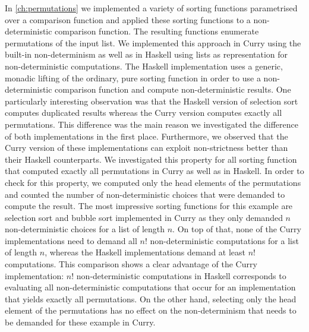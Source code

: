 In \autoref{ch:permutations} we implemented a variety of sorting functions parametrised over a comparison function and applied these sorting functions to a non\--deterministic comparison function.
The resulting functions enumerate permutations of the input list.
We implemented this approach in Curry using the built\--in non\--determinism as well as in Haskell using lists as representation for non\--deterministic computations.
The Haskell implementation uses a generic, monadic lifting of the ordinary, pure sorting function in order to use a non\--deterministic comparison function and compute non\--deterministic results.
One particularly interesting observation was that the Haskell version of selection sort computes duplicated results whereas the Curry version computes exactly all permutations.
This difference was the main reason we investigated the difference of both implementations in the first place.
Furthermore, we observed that the Curry version of these implementations can exploit non\--strictness better than their Haskell counterparts.
We investigated this property for all sorting function that computed exactly all permutations in Curry as well as in Haskell.
In order to check for this property, we computed only the head elements of the permutations and counted the number of non\--deterministic choices that were demanded to compute the result.
The most impressive sorting functions for this example are selection sort and bubble sort implemented in Curry as they only demanded $n$ non\--deterministic choices for a list of length $n$.
On top of that, none of the Curry implementations need to demand all $n!$ non\--deterministic computations for a list of length $n$, whereas the Haskell implementations demand at least $n!$ computations.
This comparison shows a clear advantage of the Curry implementation: $n!$ non\--deterministic computations in Haskell corresponds to evaluating all non\--deterministic computations that occur for an implementation that yields exactly all permutations.
On the other hand, selecting only the head element of the permutations has no effect on the non\--determinism that needs to be demanded for these example in Curry.

